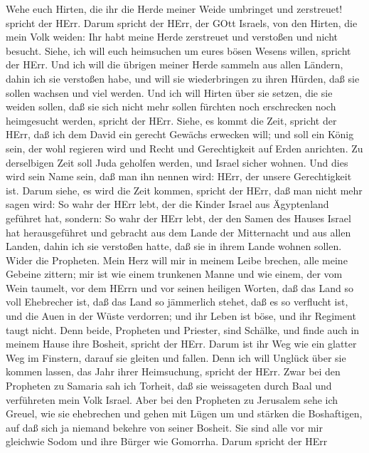 Wehe euch Hirten, die ihr die Herde meiner Weide umbringet
und zerstreuet! spricht der HErr.  Darum spricht der HErr,
der GOtt Israels, von den Hirten, die mein Volk weiden: Ihr habt meine
Herde zerstreuet und verstoßen und nicht besucht. Siehe, ich will euch
heimsuchen um eures bösen Wesens willen, spricht der HErr. 
Und ich will die übrigen meiner Herde sammeln aus allen Ländern, dahin
ich sie verstoßen habe, und will sie wiederbringen zu ihren Hürden, daß
sie sollen wachsen und viel werden.  Und ich will Hirten
über sie setzen, die sie weiden sollen, daß sie sich nicht mehr sollen
fürchten noch erschrecken noch heimgesucht werden, spricht der HErr.
 Siehe, es kommt die Zeit, spricht der HErr, daß ich dem
David ein gerecht Gewächs erwecken will; und soll ein König sein, der
wohl regieren wird und Recht und Gerechtigkeit auf Erden anrichten.
 Zu derselbigen Zeit soll Juda geholfen werden, und Israel
sicher wohnen. Und dies wird sein Name sein, daß man ihn nennen wird:
HErr, der unsere Gerechtigkeit ist.  Darum siehe, es wird
die Zeit kommen, spricht der HErr, daß man nicht mehr sagen wird: So
wahr der HErr lebt, der die Kinder Israel aus Ägyptenland geführet hat,
 sondern: So wahr der HErr lebt, der den Samen des Hauses
Israel hat herausgeführet und gebracht aus dem Lande der Mitternacht und
aus allen Landen, dahin ich sie verstoßen hatte, daß sie in ihrem Lande
wohnen sollen.  Wider die Propheten. Mein Herz will mir in
meinem Leibe brechen, alle meine Gebeine zittern; mir ist wie einem
trunkenen Manne und wie einem, der vom Wein taumelt, vor dem HErrn und
vor seinen heiligen Worten,  daß das Land so voll
Ehebrecher ist, daß das Land so jämmerlich stehet, daß es so verflucht
ist, und die Auen in der Wüste verdorren; und ihr Leben ist böse, und
ihr Regiment taugt nicht.  Denn beide, Propheten und
Priester, sind Schälke, und finde auch in meinem Hause ihre Bosheit,
spricht der HErr.  Darum ist ihr Weg wie ein glatter Weg im
Finstern, darauf sie gleiten und fallen. Denn ich will Unglück über sie
kommen lassen, das Jahr ihrer Heimsuchung, spricht der HErr.
 Zwar bei den Propheten zu Samaria sah ich Torheit, daß sie
weissageten durch Baal und verführeten mein Volk Israel. 
Aber bei den Propheten zu Jerusalem sehe ich Greuel, wie sie ehebrechen
und gehen mit Lügen um und stärken die Boshaftigen, auf daß sich ja
niemand bekehre von seiner Bosheit. Sie sind alle vor mir gleichwie
Sodom und ihre Bürger wie Gomorrha.  Darum spricht der HErr
